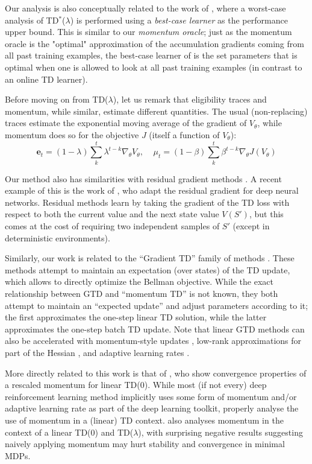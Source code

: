 Our analysis is also conceptually related to the work of \citet{schapire1996worst}, where a worst-case analysis of TD$^*$($\lambda$) is performed using a \emph{best-case learner} as the performance upper bound. This is similar to our \emph{momentum oracle}; just as the momentum oracle is the "optimal" approximation of the accumulation gradients coming from all past training examples, the best-case learner of \citet{schapire1996worst} is the set parameters that is optimal when one is allowed to look at all past training examples (in contrast to an online TD learner).

Before moving on from TD($\lambda$), let us remark that eligibility traces and momentum, while similar, estimate different quantities. The usual (non-replacing) traces estimate the exponential moving average of the gradient of $V_\theta$, while momentum does so for the objective $J$ (itself a function of $V_\theta$):
$$\mathbf{e}_t = (1-\lambda)\sum_{k}^t \lambda^{t-k} \nabla_\theta V_\theta, \;\;\;\; \mu_t = (1-\beta)\sum_{k}^t \beta^{t-k} \nabla_\theta J(V_\theta)$$

Our method also has similarities with residual gradient methods \citep{baird1995residual}. A recent example of this is the work of \citet{zhang2019deep}, who adapt the residual gradient for deep neural networks. Residual methods learn by taking the gradient of the TD loss with respect to both the current value and the next state value $V(S')$, but this comes at the cost of requiring two independent samples of $S'$ (except in deterministic environments). 

Similarly, our work is related to the ``Gradient TD'' family of methods \citep{sutton2008convergent, sutton2009fast}. These methods attempt to maintain an expectation (over states) of the TD update, which allows to directly optimize the Bellman objective. While the exact relationship between GTD and ``momentum TD'' is not known, they both attempt to maintain an ``expected update'' and adjust parameters according to it; the first approximates the one-step linear TD solution, while the latter approximates the one-step batch TD update. Note that linear GTD methods can also be accelerated with momentum-style updates \citep{meyer2014accelerated}, low-rank approximations for part of the Hessian \citep{pan2016accelerated}, and adaptive learning rates \citep{gupta2019finite}. 


More directly related to this work is that of \citet{sun2020adaptive}, who show convergence properties of a rescaled momentum for linear TD(0). While most (if not every) deep reinforcement learning method implicitly uses some form of momentum and/or adaptive learning rate as part of the deep learning toolkit, \citet{sun2020adaptive} properly analyse the use of momentum in a (linear) TD context. \citet{gupta2020applicability} also analyses momentum in the context of a linear TD(0) and TD($\lambda$), with surprising negative results suggesting naively applying momentum may hurt stability and convergence in minimal MDPs.

